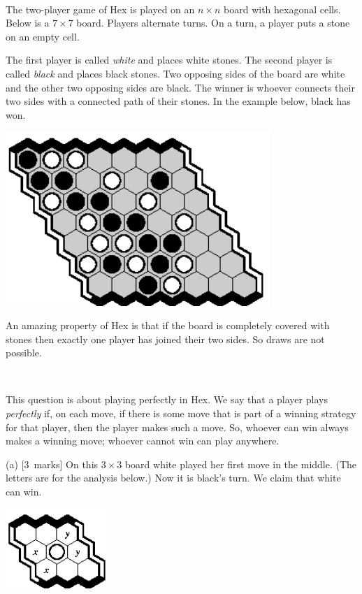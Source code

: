 \documentclass[12pt]{article}
\newcommand{\mymarks}[1]{\mbox{\small [#1 marks]}}
\begin{document}
~

The two-player game of Hex is played on an $n \times n$ 
board with hexagonal cells. Below is a $7 \times 7$ board. 
Players alternate turns. 
On a turn, a player puts a stone on an empty cell.

The first player is called {\em white} and places white stones. 
The second player is called {\em black} and places black stones. 
Two opposing sides of the board are white and the other two 
opposing sides are black.
The winner is whoever connects
their two sides with a connected path of their stones. 
In the example below, black has won.

\begin{center}
\includegraphics[width=100mm]{fz/pix/7x7-f1b6.eps}
\end{center}

An amazing property of Hex 
is that if the board is completely covered with stones then
exactly one player has joined their two sides. So draws are not possible.

~

This question is about playing perfectly in Hex.
We say that a player plays {\em perfectly} if,
on each move, if there is some move that is part
of a winning strategy for that player,
then the player makes such a move.
So, whoever can win always makes a winning move;
whoever cannot win can play anywhere.

\newpage

(a) \mymarks{3}
On this $3 \times 3$ board white played her first move 
in the middle. (The letters are for the analysis below.)
Now it is black's turn.
We claim that white can win.

\begin{center}
\includegraphics[width=40mm]{fz/pix/3x3-marked.eps}
\end{center}
\end{document}
